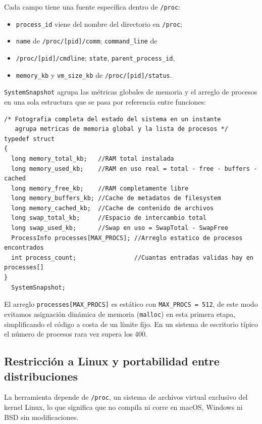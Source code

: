 \documentclass[12pt,letterpaper]{article}
\begin{document}
Cada campo tiene una fuente específica dentro de \texttt{/proc}:

\begin{itemize}
\item \texttt{process\_id} viene del nombre del directorio en \texttt{/proc};
\item \texttt{name} de \texttt{/proc/[pid]/comm}; \texttt{command\_line} de
\item \texttt{/proc/[pid]/cmdline}; \texttt{state}, \texttt{parent\_process\_id},
\item \texttt{memory\_kb} y \texttt{vm\_size\_kb} de \texttt{/proc/[pid]/status}.
\end{itemize}

\medskip

\texttt{SystemSnapshot} agrupa las métricas globales de memoria y el arreglo de procesos en una sola estructura
que se pasa por referencia entre funciones:

\begin{lstlisting}[style=modernc, caption={\texttt{monitor.h} struct SystemSnapshot (líneas 23--34)}]
/* Fotografia completa del estado del sistema en un instante
   agrupa metricas de memoria global y la lista de procesos */
typedef struct
{
  long memory_total_kb;   //RAM total instalada
  long memory_used_kb;    //RAM en uso real = total - free - buffers - cached
  long memory_free_kb;    //RAM completamente libre
  long memory_buffers_kb; //Cache de metadatos de filesystem
  long memory_cached_kb;  //Cache de contenido de archivos
  long swap_total_kb;     //Espacio de intercambio total
  long swap_used_kb;      //Swap en uso = SwapTotal - SwapFree
  ProcessInfo processes[MAX_PROCS]; //Arreglo estatico de procesos encontrados
  int process_count;                //Cuantas entradas validas hay en processes[]
}
  SystemSnapshot;
\end{lstlisting}

\bigskip

El arreglo \texttt{processes[MAX\_PROCS]} es estático con \texttt{MAX\_PROCS = 512}, de este modo evitamos
asignación dinámica de memoria (\texttt{malloc}) en esta primera etapa, simplificando el código a costa de un
límite fijo. En un sistema de escritorio típico el número de procesos rara vez supera los 400.

\subsection*{Restricción a Linux y portabilidad entre distribuciones}
La herramienta depende de \texttt{/proc}, un sistema de archivos virtual exclusivo del kernel Linux, lo que
significa que no compila ni corre en macOS, Windows ni BSD sin modificaciones.
\end{document}
